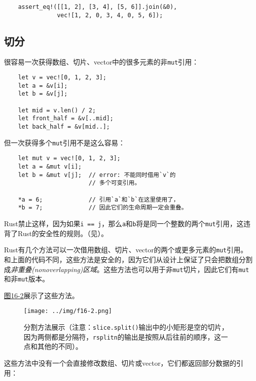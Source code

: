\begin{verbatim}
    assert_eq!([[1, 2], [3, 4], [5, 6]].join(&0),
               vec![1, 2, 0, 3, 4, 0, 5, 6]);
\end{verbatim}

\subsection{切分}\label{split}
很容易一次获得数组、切片、vector中的很多元素的非\texttt{mut}引用：
\begin{verbatim}
    let v = vec![0, 1, 2, 3];
    let a = &v[i];
    let b = &v[j];

    let mid = v.len() / 2;
    let front_half = &v[..mid];
    let back_half = &v[mid..];
\end{verbatim}

但一次获得多个\texttt{mut}引用不是这么容易：
\begin{verbatim}
    let mut v = vec![0, 1, 2, 3];
    let a = &mut v[i];
    let b = &mut v[j];  // error: 不能同时借用`v`的
                        // 多个可变引用。

    *a = 6;             // 引用`a`和`b`在这里使用了，
    *b = 7;             // 因此它们的生命周期一定会重叠。
\end{verbatim}

Rust禁止这样，因为如果\texttt{i == j}，那么\texttt{a}和\texttt{b}将是同一个整数的两个\texttt{mut}引用，这违背了Rust的安全性的规则。（见）。

Rust有几个方法可以一次借用数组、切片、vector的两个或更多元素的\texttt{mut}引用。和上面的代码不同，这些方法是安全的，因为它们从设计上保证了只会把数组分割成\emph{非重叠(nonoverlapping)区域}。这些方法也可以用于非\texttt{mut}切片，因此它们有\texttt{mut}和非\texttt{mut}版本。

\hyperref[f16-2]{图16-2}展示了这些方法。

\begin{figure}[htbp]
    \centering
    \texttt{[image: ../img/f16-2.png]}
    \caption{分割方法展示（注意：\texttt{slice.split()}输出中的小矩形是空的切片，因为两侧都是分隔符，\texttt{rsplitn}的输出是按照从后往前的顺序，这一点和其他的不同）。}
    \label{f16-2}
\end{figure}

这些方法中没有一个会直接修改数组、切片或vector，它们都返回部分数据的引用：

